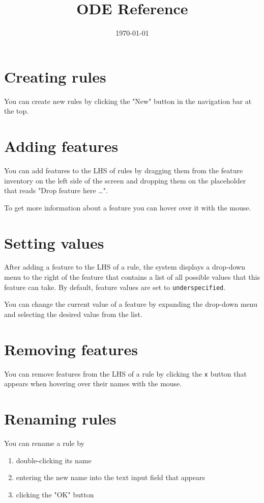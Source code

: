 \documentclass[11pt]{article}
\date{\today}
\title{ODE Reference}
\begin{document}
\maketitle
\tableofcontents

\section{Creating rules}
\label{sec-1}
You can create new rules by clicking the "New" button in the
navigation bar at the top.

\section{Adding features}
\label{sec-2}
You can add features to the LHS of rules by dragging them from the
feature inventory on the left side of the screen and dropping them
on the placeholder that reads "Drop feature here \ldots{}".

To get more information about a feature you can hover over it with
the mouse.

\section{Setting values}
\label{sec-3}
After adding a feature to the LHS of a rule, the system displays a
drop-down menu to the right of the feature that contains a list of
all possible values that this feature can take. By default, feature
values are set to \texttt{underspecified}.

You can change the current value of a feature by expanding the
drop-down menu and selecting the desired value from the list.

\section{Removing features}
\label{sec-4}
You can remove features from the LHS of a rule by clicking the \texttt{x}
button that appears when hovering over their names with the mouse.

\section{Renaming rules}
\label{sec-5}
You can rename a rule by

\begin{enumerate}
\item double-clicking its name
\item entering the new name into the text input field that appears
\item clicking the "OK" button
\end{enumerate}
\end{document}
